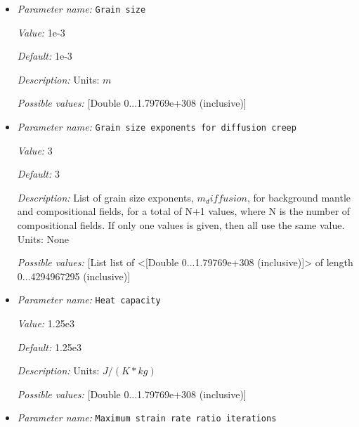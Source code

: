 \begin{itemize}
{\it Default:} 1.0


{\it Description:} Scaling coefficient for effective viscosity.


{\it Possible values:} [Double 0...1.79769e+308 (inclusive)]
\item {\it Parameter name:} {\tt Grain size}
\label{parameters:Material model/Diffusion dislocation/Grain size}


{\it Value:} 1e-3


{\it Default:} 1e-3


{\it Description:} Units: $m$


{\it Possible values:} [Double 0...1.79769e+308 (inclusive)]
\item {\it Parameter name:} {\tt Grain size exponents for diffusion creep}
\label{parameters:Material model/Diffusion dislocation/Grain size exponents for diffusion creep}


{\it Value:} 3


{\it Default:} 3


{\it Description:} List of grain size exponents, $m_diffusion$, for background mantle and compositional fields, for a total of N+1 values, where N is the number of compositional fields. If only one values is given, then all use the same value.  Units: None


{\it Possible values:} [List list of <[Double 0...1.79769e+308 (inclusive)]> of length 0...4294967295 (inclusive)]
\item {\it Parameter name:} {\tt Heat capacity}
\label{parameters:Material model/Diffusion dislocation/Heat capacity}


{\it Value:} 1.25e3


{\it Default:} 1.25e3


{\it Description:} Units: $J / (K * kg)$


{\it Possible values:} [Double 0...1.79769e+308 (inclusive)]
\item {\it Parameter name:} {\tt Maximum strain rate ratio iterations}
\label{parameters:Material model/Diffusion dislocation/Maximum strain rate ratio iterations}



\end{itemize}
